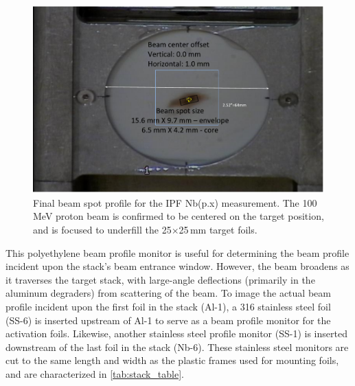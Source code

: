 \begin{figure}
 \centering
 \includegraphics[width=0.75\columnwidth]{./figures/ipf_preexp_beam_spot-cropped.pdf}
 \caption{Final beam spot profile for the IPF Nb(p.x) measurement. The 100\,MeV proton beam is confirmed to be centered on the target position, and is focused to underfill the 25$\times$25\,mm target foils.}
 \label{fig:ipf_preexp_beam_spot}
\end{figure}




This polyethylene beam profile monitor is useful for determining the beam profile incident upon the stack's beam entrance window.
However, the beam broadens as it traverses the target stack, with large-angle deflections (primarily in the aluminum degraders) from scattering of the beam.
To image the actual beam profile incident upon the first foil in the stack (Al-1), a 316 stainless steel foil (SS-6) is inserted upstream of Al-1 to serve as a beam profile monitor for the activation foils.
Likewise, another stainless steel profile monitor (SS-1) is inserted downstream of the last foil in the stack (Nb-6).
These stainless steel monitors are cut to the same length and width as the plastic frames used for mounting foils, and are characterized in \autoref{tab:stack_table}.





